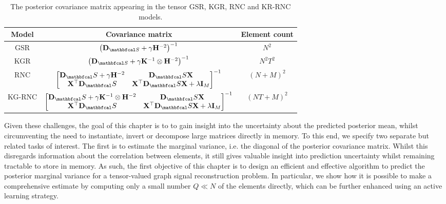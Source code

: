 \begin{table}[ht]
    \def\arraystretch{1.5}
    \centering
    \begin{tabular}{|c|c|c|}
    \hline
    \textbf{Model} & \textbf{Covariance matrix} & \textbf{Element count}\\
    \hline
    GSR & $\left(\D_{\St} + \gamma \HH^{-2}\right)^{-1}$ & $ N^2 $\\ 
    \hline
    KGR & $\left(\D_{\St} + \gamma \K^{-1} \otimes \HH^{-2}\right)^{-1}$ & $N^2T^2$\\ 
    \hline
    RNC & $\begin{bmatrix}
        \D_\St + \gamma \HH^{-2} & \D_\St  \X \\
        \X^\top \D_\St & \X^\top \D_\St \X + \lambda \I_M   
       \end{bmatrix}^{-1}$ & $(N + M)^2$ \\ 
    \hline
    KG-RNC & $\begin{bmatrix}
        \D_\St + \gamma \K^{-1} \otimes \HH^{-2} & \D_\St  \X \\
        \X^\top \D_\St & \X^\top \D_\St \X + \lambda \I_M   
       \end{bmatrix}^{-1}$ & $(NT + M)^2$ \\
    \hline
\end{tabular}
\caption{The posterior covariance matrix appearing in the tensor GSR, KGR, RNC and KR-RNC models.}
\label{tab:post_cov}
\end{table}

\setcellgapes{2pt}


Given these challenges, the goal of this chapter is to to gain insight into the uncertainty about the predicted posterior mean, whilst circumventing the need to instantiate, invert or decompose large matrices directly in memory. To this end, we specify two separate but related tasks of interest. The first is to estimate the marginal variance, i.e. the diagonal of the posterior covariance matrix. Whilst this disregards information about the correlation between elements, it still gives valuable insight into prediction uncertainty whilst remaining tractable to store in memory. As such, the first objective of this chapter is to design an efficient and effective algorithm to predict the posterior marginal variance for a tensor-valued graph signal reconstruction problem. In particular, we show how it is possible to make a comprehensive estimate by computing only a small number $Q \ll N$ of the elements directly, which can be further enhanced using an active learning strategy. 

